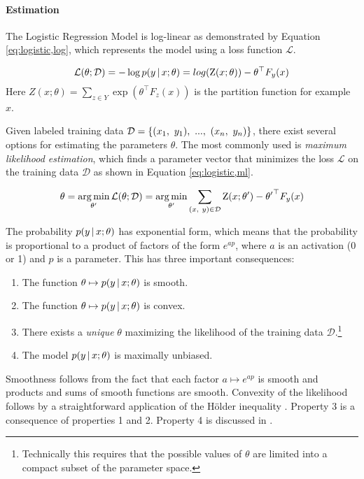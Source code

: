 \paragraph{Estimation}
The Logistic Regression Model is log-linear as demonstrated by
Equation \ref{eq:logistic,log}, which represents the model using a
loss function $\mathcal{L}$.

\begin{equation}
\mathcal{L}(\theta\mbox{$ ; \, $}\mathcal{D}) = -\log p(y\mbox{$ \, | \, $} x\mbox{$ ; \, $} \theta) = log(\mbox{${\rm Z}$}(x;\theta)) - \theta^\top F_y(x)\label{eq:logistic,log}
\end{equation}
Here $Z(x;\theta) = \sum_{z \in Y}\exp(\theta^\top F_{z}(x))$ is the partition function for example $x$.

Given labeled training data $\mbox{${\mathcal{D}}$} = \{(x_1,\ y_1),\ ...,\ (x_n,\
y_n)\}$, there exist several options for estimating the parameters
$\theta$. The most commonly used is {\it maximum likelihood estimation},
which finds a parameter vector that minimizes the loss $\mathcal{L}$ on the
training data $\mathcal{D}$ as shown in Equation \eqref{eq:logistic,ml}.

\begin{equation}
\theta = \operatorname*{arg\,min}_{\theta'} \mathcal{L}(\theta\mbox{$ ; \, $} \mathcal{D}) = \operatorname*{arg\,min}_{\theta'}\sum_{(x,\ y) \in \mathcal{D}} \mbox{${\rm Z}$}(x\mbox{$ ; \, $} \theta') - {\theta'}^\top F_y(x)\label{eq:logistic,ml}
\end{equation}

The probability $p(y\mbox{$ \, | \, $} x\mbox{$ ; \, $} \theta)$ has exponential form,
which means that the probability is proportional to a product of
factors of the form $e^{ap}$, where $a$ is an activation (0 or 1) and
$p$ is a parameter. This has three important consequences:

\begin{enumerate}
\item The function $\theta \mapsto p(y\mbox{$ \, | \, $} x\mbox{$ ; \, $} \theta)$ is smooth.
\item The function $\theta \mapsto p(y\mbox{$ \, | \, $} x\mbox{$ ; \, $} \theta)$ is convex.
\item There exists a {\it unique} $\theta$ maximizing the likelihood of the training data $\mathcal{D}$.\footnote{Technically this requires that the possible values of $\theta$ are limited into a compact subset of the parameter space.}
\item The model $p(y\mbox{$ \, | \, $} x\mbox{$ ; \, $} \theta)$ is maximally unbiased. 
\end{enumerate}

Smoothness follows from the fact that each factor $a \mapsto e^{ap}$
is smooth and products and sums of smooth functions are
smooth. Convexity of the likelihood follows by a straightforward application of the Hölder inequality \cite{}. Property 3 is a consequence of properties 1 and 2.
Property 4 is discussed in \cite{foo}.

